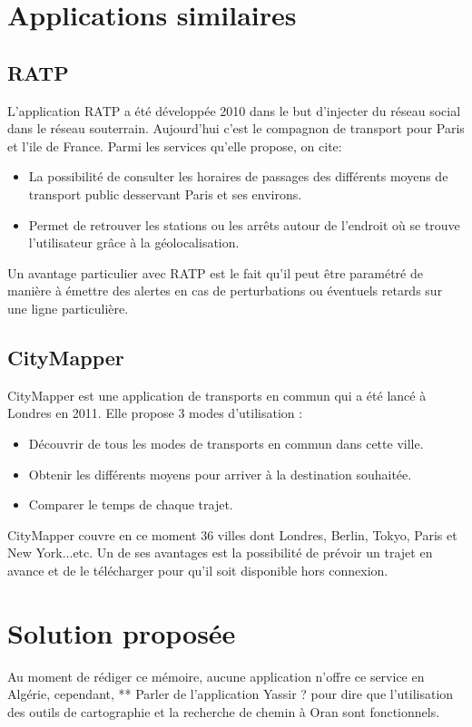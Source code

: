 		\section{Applications similaires}			
		\subsection{RATP}
		L'application RATP a été développée 2010 dans le but d'injecter du réseau social dans le réseau souterrain. Aujourd'hui c'est le compagnon de transport pour Paris et l'ile de France.
Parmi les services qu'elle propose, on cite:
	\begin{itemize}
	\item La possibilité de consulter les horaires de passages des différents moyens de transport public desservant Paris et ses environs. 
	\item Permet de retrouver les stations ou les arrêts autour de l'endroit où se trouve l'utilisateur grâce à la géolocalisation.
	\end{itemize}
	Un avantage particulier avec RATP est le fait qu'il peut être paramétré de manière à émettre des alertes en cas de perturbations ou éventuels retards sur une ligne particulière.
	
		\subsection{CityMapper}
		CityMapper est une application de transports en commun qui a été lancé à Londres en 2011.
Elle propose 3 modes d'utilisation : 
	\begin{itemize}
	\item Découvrir de tous les modes de transports en commun dans cette ville.
	\item Obtenir les différents moyens pour arriver à la destination souhaitée.
	\item Comparer le temps de chaque trajet.
	\end{itemize}

	CityMapper couvre en ce moment 36 villes dont Londres, Berlin, Tokyo, Paris et New York...etc.  Un de ses avantages est la possibilité de prévoir un trajet en avance et de le télécharger pour qu'il soit disponible hors connexion.

		\section{Solution proposée}
		Au moment de rédiger ce mémoire, aucune application n'offre ce service en Algérie, cependant, ** Parler de l'application Yassir ? pour dire que l'utilisation des outils de cartographie et la recherche de chemin à Oran sont fonctionnels.
		
